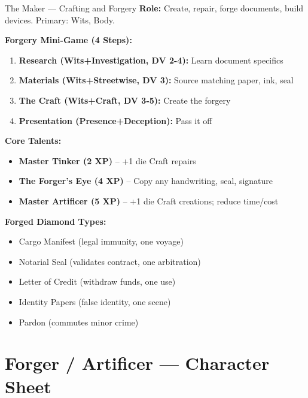 \documentclass[10pt]{article}
\begin{document}
\begin{tipbox}{The Maker --- Crafting and Forgery}
    \textbf{Role:} Create, repair, forge documents, build devices. Primary: Wits, Body.
    
    \textbf{Forgery Mini-Game (4 Steps):}
    \begin{enumerate}
        \item \textbf{Research (Wits+Investigation, DV 2-4):} Learn document specifics
        \item \textbf{Materials (Wits+Streetwise, DV 3):} Source matching paper, ink, seal
        \item \textbf{The Craft (Wits+Craft, DV 3-5):} Create the forgery
        \item \textbf{Presentation (Presence+Deception):} Pass it off
    \end{enumerate}
    
    \textbf{Core Talents:}
    \begin{itemize}
        \item \textbf{Master Tinker (2 XP)} -- +1 die Craft repairs
        \item \textbf{The Forger's Eye (4 XP)} -- Copy any handwriting, seal, signature
        \item \textbf{Master Artificer (5 XP)} -- +1 die Craft creations; reduce time/cost
    \end{itemize}
    
    \textbf{Forged Diamond Types:}
    \begin{itemize}
        \item Cargo Manifest (legal immunity, one voyage)
        \item Notarial Seal (validates contract, one arbitration)
        \item Letter of Credit (withdraw funds, one use)
        \item Identity Papers (false identity, one scene)
        \item Pardon (commutes minor crime)
    \end{itemize}
\end{tipbox}

\newpage

\section*{Forger / Artificer --- Character Sheet}
\end{document}
